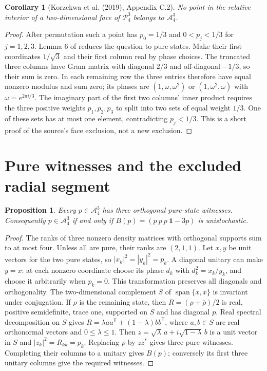\documentclass[11pt]{article}
\newtheorem{proposition}[theorem]{Proposition}
\newtheorem{corollary}[theorem]{Corollary}
\newcommand{\A}{\mathcal A}
\newcommand{\Pp}{\mathcal P}
\begin{document}
\begin{corollary}[Korzekwa et al. (2019), Appendix C.2]\label{cor:face}
No point in the relative interior of a two-dimensional face of $\Pp_4^3$
belongs to $\A_4^3$.
\end{corollary}
\begin{proof}
After permutation such a point has $p_0=1/3$ and
$0<p_j<1/3$ for $j=1,2,3$. Lemma 6 of \cite{KCPZ} reduces the question
to pure states. Make their first coordinates $1/\sqrt3$ and their first
column real by phase choices. The truncated three columns have Gram matrix
with diagonal $2/3$ and off-diagonal $-1/3$, so their sum is zero.
In each remaining row the three entries therefore have equal nonzero modulus
and sum zero; its phases are $(1,\omega,\omega^2)$ or
$(1,\omega^2,\omega)$ with $\omega=e^{2\pi i/3}$.
The imaginary part of the first two columns' inner product requires the
three positive weights $p_1,p_2,p_3$ to split into two sets of equal weight
$1/3$. One of these sets has at most one element, contradicting $p_j<1/3$.
This is a short proof of the source's face exclusion, not a new exclusion.
\end{proof}

\section{Pure witnesses and the excluded radial segment}
\begin{proposition}\label{prop:pure}
Every $p\in\A_4^3$ has three orthogonal pure-state witnesses.
Consequently $p\in\A_4^3$ if and only if
$B(p)=(p\ p\ p\ \mathbf1-3p)$ is unistochastic.
\end{proposition}
\begin{proof}
The ranks of three nonzero density matrices with orthogonal supports
sum to at most four. Unless all are pure, their ranks are $(2,1,1)$.
Let $x,y$ be unit vectors for the two pure states, so
$|x_k|^2=|y_k|^2=p_k$. A diagonal unitary can make $y=\overline x$:
at each nonzero coordinate choose its phase $d_k$ with
$d_k^2=\overline{x_k}/y_k$, and choose it arbitrarily when $p_k=0$.
This transformation preserves all diagonals and orthogonality.
The two-dimensional complement $S$ of $\operatorname{span}\{x,\overline x\}$
is invariant under conjugation. If $\rho$ is the remaining state, then
$R=(\rho+\overline\rho)/2$ is real, positive semidefinite, trace one,
supported on $S$ and has diagonal $p$.
Real spectral decomposition on $S$ gives
$R=\lambda aa^{\mathsf T}+(1-\lambda)bb^{\mathsf T}$,
where $a,b\in S$ are real orthonormal vectors and $0\le\lambda\le1$.
Then $z=\sqrt\lambda\,a+i\sqrt{1-\lambda}\,b$ is a unit vector in $S$
and $|z_k|^2=R_{kk}=p_k$. Replacing $\rho$ by $zz^*$ gives three pure
witnesses. Completing their columns to a unitary gives $B(p)$;
conversely its first three unitary columns give the required witnesses.
\end{proof}
\end{document}
